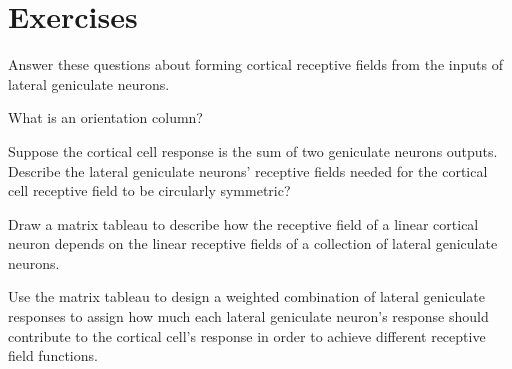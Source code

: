 %
%

\nocite{Wong-Riley1984}
\nocite{Hubel1972a,Hubel1972b,Hubel1974,Hubel1974b}
\nocite{Wiesel1966}
\nocite{Devalois1982b,DeValois1988}
\nocite{Movshon1978a,Movshon1978b,Movshon1985}
\nocite{Britten1992}
\nocite{Brindley1968}
\nocite{Bak1990}
\nocite{Poggio1984a}
\nocite{Albright1984}
\nocite{Freeman1990}
\nocite{Tolhurst1983}
\nocite{Parker1985}
\nocite{Hawken1990}
\nocite{Vogels1990}
\nocite{Salzman1992}
\nocite{Livingstone1984,Livingstone1987}
\nocite{Martin1988}  %
\nocite{Zeki1971,Zeki1983c,Zeki1990Zeki1991}

\nocite{Barlow1972} %

\newpage
\section*{Exercises}

\be %


\item Answer these questions about forming
cortical receptive fields from the inputs of lateral geniculate neurons.

 \be

 \item What is an orientation column?

 \item Suppose the cortical cell response is the
sum of two geniculate neurons outputs.
Describe the lateral geniculate neurons' receptive fields
needed for the cortical cell receptive field to be circularly symmetric?

 \item Draw a matrix tableau
to describe how the receptive field of a linear
cortical neuron depends on the linear receptive fields
of a collection of lateral geniculate neurons.

 \item  Use the matrix tableau
to design a weighted combination of lateral geniculate
responses to assign how much each lateral geniculate
neuron's response should contribute to the
cortical cell's response in order to achieve
different receptive field functions.

 \ee

